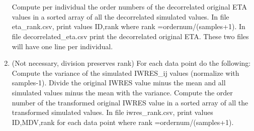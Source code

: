\documentclass[a4paper,12pt]{article}
\begin{document}
\begin{enumerate}
\\
\\
Compute per individual the order numbers of the decorrelated original ETA values in a sorted array of all the decorrelated simulated values. In file eta\_rank.csv, print values ID,rank where rank =ordernum/(samples+1). In file decorrelated\_eta.csv print the decorrelated original ETA. These two files will have one line per individual.
\item (Not necessary, division preserves rank) For each data point do the following: Compute the variance of the simulated IWRES\_ij values (normalize with samples-1). Divide the original IWRES value minus the mean and all simulated values minus the mean with the variance. Compute the order number of the transformed original IWRES value in a sorted array of all the transformed simulated values. In file iwres\_rank.csv, print values ID,MDV,rank for each data point where rank =ordernum/(samples+1).  
\end{enumerate}
\end{document}
